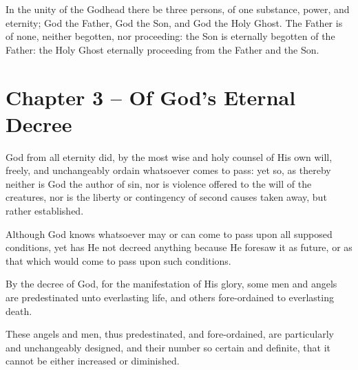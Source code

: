 \begin{outerlst}[left=0pt,labelsep=0pt]
\begin{innerlst}[resume*]
\item In the unity of the Godhead there be three persons, of one substance, power, and eternity; God the Father, God the Son, and God the Holy Ghost. The Father is of none, neither begotten, nor proceeding: the Son is eternally begotten of the Father: the Holy Ghost eternally proceeding from the Father and the Son.   
\end{innerlst}

\item
{}
\section{Chapter 3 -- Of God's Eternal Decree}
\begin{innerlst}[resume*] 

\item God from all eternity did, by the most wise and holy counsel of His own will, freely, and unchangeably ordain whatsoever comes to pass: yet so, as thereby neither is God the author of sin, nor is violence offered to the will of the creatures, nor is the liberty or contingency of second causes taken away, but rather established.

\item Although God knows whatsoever may or can come to pass upon all supposed conditions, yet has He not decreed anything because He foresaw it as future, or as that which would come to pass upon such conditions.

\item By the decree of God, for the manifestation of His glory, some men and angels are predestinated unto everlasting life, and others fore-ordained to everlasting death.

\item These angels and men, thus predestinated, and fore-ordained, are particularly and unchangeably designed, and their number so certain and definite, that it cannot be either increased or diminished.


\end{innerlst}
\end{outerlst}
